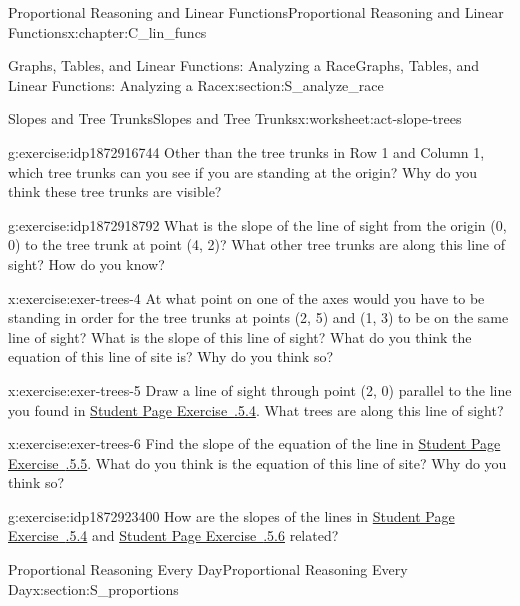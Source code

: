 \documentclass[oneside,10pt,]{book}
\newcommand{\xreffont}{\relax}
\numberwithin{equation}{chapter}
\begin{document}
\begin{chapterptx}{Proportional Reasoning and Linear Functions}{}{Proportional Reasoning and Linear Functions}{}{}{x:chapter:C_lin_funcs}
\begin{sectionptx}{Graphs, Tables, and Linear Functions: Analyzing a Race}{}{Graphs, Tables, and Linear Functions: Analyzing a Race}{}{}{x:section:S_analyze_race}
\begin{worksheet-subsection}{Slopes and Tree Trunks}{}{Slopes and Tree Trunks}{}{}{x:worksheet:act-slope-trees}
\begin{divisionexercise}{2}{}{}{g:exercise:idp1872916744}%
Other than the tree trunks in Row 1 and Column 1, which tree trunks can you see if you are standing at the origin? Why do you think these tree trunks are visible?%
\end{divisionexercise}%
\begin{divisionexercise}{3}{}{}{g:exercise:idp1872918792}%
What is the slope of the line of sight from the origin (0, 0) to the tree trunk at point (4, 2)? What other tree trunks are along this line of sight? How do you know?%
\end{divisionexercise}%
\begin{divisionexercise}{4}{}{}{x:exercise:exer-trees-4}%
At what point on one of the axes would you have to be standing in order for the tree trunks at points (2, 5) and (1, 3) to be on the same line of sight? What is the slope of this line of sight? What do you think the equation of this line of site is? Why do you think so?%
\end{divisionexercise}%
\begin{divisionexercise}{5}{}{}{x:exercise:exer-trees-5}%
Draw a line of sight through point (2, 0) parallel to the line you found in \hyperlink{x:exercise:exer-trees-4}{Student Page Exercise~{\xreffont 2.4.5.4}}. What trees are along this line of sight?%
\end{divisionexercise}%
\begin{divisionexercise}{6}{}{}{x:exercise:exer-trees-6}%
Find the slope of the equation of the line in \hyperlink{x:exercise:exer-trees-5}{Student Page Exercise~{\xreffont 2.4.5.5}}. What do you think is the equation of this line of site? Why do you think so?%
\end{divisionexercise}%
\begin{divisionexercise}{7}{}{}{g:exercise:idp1872923400}%
How are the slopes of the lines in \hyperlink{x:exercise:exer-trees-4}{Student Page Exercise~{\xreffont 2.4.5.4}} and \hyperlink{x:exercise:exer-trees-6}{Student Page Exercise~{\xreffont 2.4.5.6}} related?%
\end{divisionexercise}%
\end{worksheet-subsection}
\restoregeometry
\end{sectionptx}
%
%
\typeout{************************************************}
\typeout{************************************************}
%
\begin{sectionptx}{Proportional Reasoning Every Day}{}{Proportional Reasoning Every Day}{}{}{x:section:S_proportions}

\end{sectionptx}
\end{chapterptx}
\end{document}
